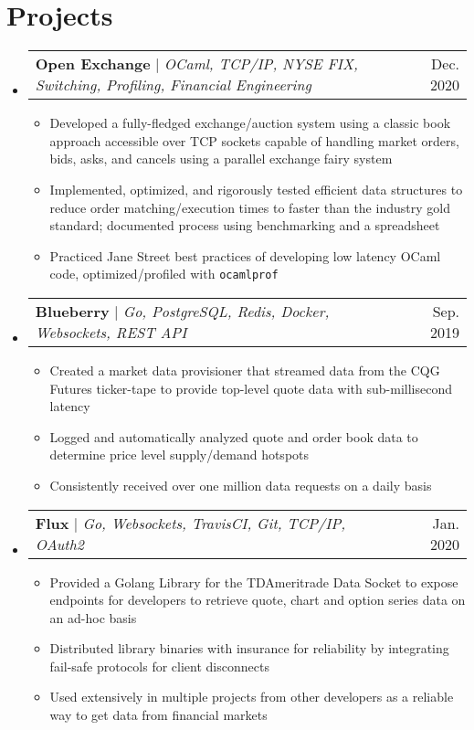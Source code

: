 \documentclass[letterpaper,11pt]{article}
\makeatletter
\newcommand{\resumeItem}[1]{
  \item\small{
    {#1 \vspace{-3pt}}
  }
}
\newcommand{\resumeProjectHeading}[2]{
    \item
    \begin{tabular*}{0.97\textwidth}{l@{\extracolsep{\fill}}r}
      \small#1 & #2 \\
    \end{tabular*}\vspace{-7pt}
}
\newcommand{\resumeSubHeadingListStart}{\begin{itemize}[leftmargin=0.15in,
    label={}]}
\newcommand{\resumeSubHeadingListEnd}{\end{itemize}}
\newcommand{\resumeItemListStart}{\begin{itemize}}
\newcommand{\resumeItemListEnd}{\end{itemize}\vspace{-5pt}}
\makeatother
\begin{document}
\section{Projects}
    \resumeSubHeadingListStart
      \resumeProjectHeading
          {\textbf{Open Exchange} $|$ \emph{OCaml, TCP/IP, NYSE FIX, Switching, 
                Profiling, Financial Engineering}}{Dec. 2020}
          \resumeItemListStart
            \resumeItem{Developed a fully-fledged exchange/auction system using
            a classic book approach accessible over TCP sockets
        capable of handling market orders, bids, asks, and
    cancels using a parallel exchange fairy system}
            \resumeItem{Implemented, optimized, and rigorously tested efficient data structures to reduce order matching/execution times to faster than the industry gold standard; documented process using benchmarking and a spreadsheet}
            \resumeItem{Practiced Jane Street best practices of developing low latency OCaml code, optimized/profiled with \texttt{ocamlprof}}
          \resumeItemListEnd
    
      \resumeProjectHeading
          {\textbf{Blueberry} $|$ \emph{Go, PostgreSQL, Redis, Docker, Websockets, REST API}}{Sep. 2019}
          \resumeItemListStart
            \resumeItem{Created a market data provisioner that streamed data from the CQG Futures ticker-tape to provide top-level quote data with sub-millisecond latency}
            \resumeItem{Logged and automatically analyzed quote and order book data to determine price level supply/demand hotspots}
            \resumeItem{Consistently received over one million data requests on a daily basis}
          \resumeItemListEnd
      \resumeProjectHeading
          {\textbf{Flux} $|$ \emph{Go, Websockets, TravisCI, Git, TCP/IP, OAuth2}}{Jan. 2020}
          \resumeItemListStart
            \resumeItem{Provided a Golang Library for the TDAmeritrade Data Socket to expose endpoints for developers to retrieve quote, chart and option series data on an ad-hoc basis}
            \resumeItem{Distributed library binaries with insurance for reliability by integrating fail-safe protocols for client disconnects}
            \resumeItem{Used extensively in multiple projects from other developers as a reliable way to get data from financial markets}
          \resumeItemListEnd
    \resumeSubHeadingListEnd
\end{document}
